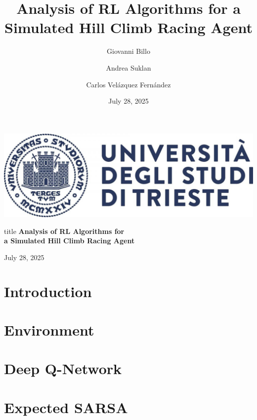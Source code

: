 \documentclass[serif]{beamer}  %
\author{
    Giovanni Billo
    \and  
    Andrea Suklan
    \and  
    Carlos Velázquez Fernández
}
\title{Analysis of RL Algorithms for a Simulated Hill Climb Racing Agent}
\date{\small July 28, 2025}
\begin{document}
\begin{frame}
    \vfill
    \begin{center}
        \includegraphics[keepaspectratio, scale=0.15]{images/logo.jpg}
        
        \vspace{1cm}
        
        \begin{beamercolorbox}[wd=\textwidth,center,rounded=true]{title}
            {\textbf{Analysis of RL Algorithms for \\ a Simulated Hill Climb Racing Agent}}
        \end{beamercolorbox}
        
        \vspace{1cm}
        
        {July 28, 2025}
    \end{center}
    \vfill
\end{frame} 

\begin{frame}    
\tableofcontents[sectionstyle=show,
subsectionstyle=show/shaded/hide,
subsubsectionstyle=show/shaded/hide]
\end{frame}


\section{Introduction}

\section{Environment}

\section{Deep Q-Network}

\section{Expected SARSA}
\end{document}
